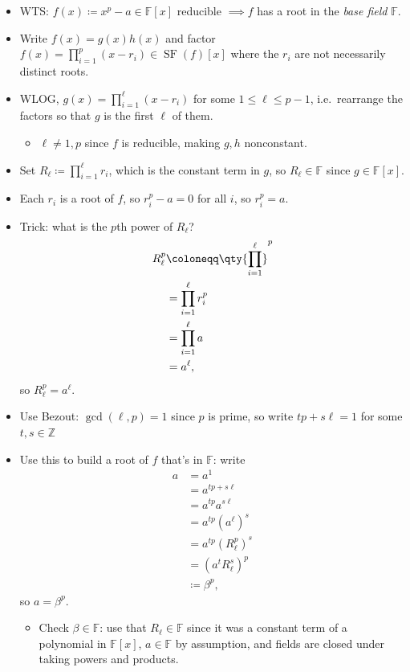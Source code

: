 \begin{solution}

\envlist

\begin{itemize}
\item
  WTS: \(f(x) \coloneqq x^p - a\in {\mathbb{F}}[x]\) reducible
  \(\implies f\) has a root in the \emph{base field} \({\mathbb{F}}\).
\item
  Write \(f(x) = g(x) h(x)\) and factor
  \(f(x) = \prod_{i=1}^p (x- r_i) \in \operatorname{SF}(f)[x]\) where
  the \(r_i\) are not necessarily distinct roots.
\item
  WLOG, \(g(x) = \prod_{i=1}^\ell (x-r_i)\) for some
  \(1\leq \ell \leq p-1\), i.e.~rearrange the factors so that \(g\) is
  the first \(\ell\) of them.

  \begin{itemize}
  \tightlist
  \item
    \(\ell \neq 1, p\) since \(f\) is reducible, making \(g, h\)
    nonconstant.
  \end{itemize}
\item
  Set \(R_\ell \coloneqq\prod_{i=1}^\ell r_i\), which is the constant
  term in \(g\), so \(R_\ell \in {\mathbb{F}}\) since
  \(g\in {\mathbb{F}}[x]\).
\item
  Each \(r_i\) is a root of \(f\), so \(r_i^p - a = 0\) for all \(i\),
  so \(r_i^p = a\).
\item
  Trick: what is the \(p\)th power of \(R_\ell\)?
  \begin{align*}
  R_\ell^p 
  &\coloneqq\qty{ \prod_{i=1}^\ell}^p \\
  &= \prod_{i=1}^\ell r_i^p \\
  &= \prod_{i=1}^\ell a \\
  &= a^\ell
  ,\end{align*}
  so \(R_\ell^p = a^\ell\).
\item
  Use Bezout: \(\gcd(\ell, p) = 1\) since \(p\) is prime, so write
  \(tp + s\ell = 1\) for some \(t,s\in {\mathbb{Z}}\)
\item
  Use this to build a root of \(f\) that's in \({\mathbb{F}}\): write
  \begin{align*}
  a &= a^1\\
  &= a^{tp + s\ell} \\
  &= a^{tp} a^{s\ell} \\
  &=a^{tp} (a^\ell)^s\\
  &= a^{tp} (R_\ell^p)^s \\
  &= (a^t R_\ell^s)^p \\
  &\coloneqq\beta^p
  ,\end{align*}
  so \(a = \beta^p\).

  \begin{itemize}
  \tightlist
  \item
    Check \(\beta\in {\mathbb{F}}\): use that
    \(R_\ell \in {\mathbb{F}}\) since it was a constant term of a
    polynomial in \({\mathbb{F}}[x]\), \(a\in {\mathbb{F}}\) by
    assumption, and fields are closed under taking powers and products.
  \end{itemize}
\end{itemize}

\end{solution}

